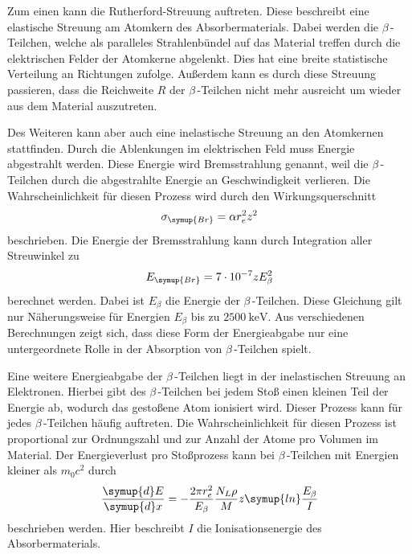 Zum einen kann die Rutherford-Streuung auftreten. Diese beschreibt eine elastische Streuung am Atomkern des Absorbermaterials. Dabei werden die $\beta$\,-Teilchen, welche 
als paralleles Strahlenbündel auf das Material treffen durch die elektrischen Felder der Atomkerne abgelenkt. Dies hat eine breite statistische Verteilung an Richtungen 
zufolge. Außerdem kann es durch diese Streuung passieren, dass die Reichweite $R$ der $\beta$\,-Teilchen nicht mehr ausreicht um wieder aus dem Material auszutreten. 


Des Weiteren kann aber auch eine inelastische Streuung an den Atomkernen stattfinden. Durch die Ablenkungen im elektrischen Feld muss Energie abgestrahlt werden. Diese 
Energie wird Bremsstrahlung genannt, weil die $\beta$\,-Teilchen durch die abgestrahlte Energie an Geschwindigkeit verlieren. Die Wahrscheinlichkeit für diesen Prozess
wird durch den Wirkungsquerschnitt
\begin{equation*}
    \sigma_{\symup{Br}} = \alpha r_e^2 z^2
\end{equation*}
beschrieben. Die Energie der Bremsstrahlung kann durch Integration aller Streuwinkel zu 
\begin{equation*}
    E_{\symup{Br}} = 7\cdot 10^{-7} z E_\beta^2
\end{equation*}
berechnet werden. Dabei ist $E_\beta$ die Energie der $\beta$\,-Teilchen. Diese Gleichung gilt nur Näherungsweise für Energien $E_\beta$ bis zu $\qty{2500}{\kilo\electronvolt}$. 
Aus verschiedenen Berechnungen zeigt sich, dass diese Form der Energieabgabe nur eine untergeordnete Rolle in der Absorption von $\beta$\,-Teilchen spielt.

Eine weitere Energieabgabe der $\beta$\,-Teilchen liegt in der inelastischen Streuung an Elektronen. Hierbei gibt des $\beta$\,-Teilchen bei jedem Stoß einen kleinen Teil der
Energie ab, wodurch das gestoßene Atom ionisiert wird. Dieser Prozess kann für jedes $\beta$\,-Teilchen häufig auftreten. Die Wahrscheinlichkeit für diesen Prozess
ist proportional zur Ordnungszahl und zur Anzahl der Atome pro Volumen im Material. Der Energieverlust pro Stoßprozess kann bei $\beta$\,-Teilchen mit Energien kleiner als
$m_0 c^2$ durch 
\begin{equation}
    \label{eqn:inelast_elek_everlust}
    \frac{\symup{d}E}{\symup{d}x} = -\frac{2\pi r_e^2}{E_\beta}\frac{N_L\rho}{M}z\symup{ln}\frac{E_\beta}{I}
\end{equation}
beschrieben werden. Hier beschreibt $I$ die Ionisationsenergie des Absorbermaterials.

